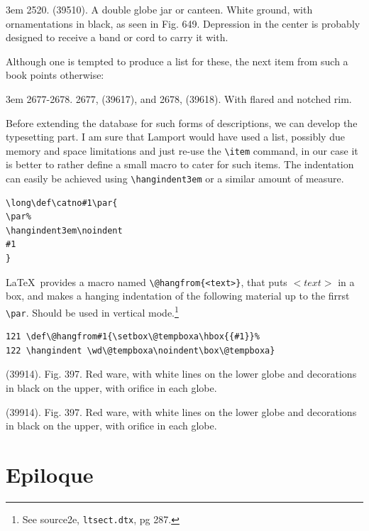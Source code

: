 \documentclass[imperial, justified]{octavo}
\begin{document}
\hangindent3em
2520. (39510). A double globe jar or canteen. White ground, with ornamentations in black, as seen in Fig. 649. Depression in the center is probably designed to receive a band or cord to carry it with.
\smallskip

Although one is tempted to produce a list for these, the next item from such a book points otherwise:
\smallskip

\hangindent3em
2677-2678. 2677, (39617), and 2678, (39618). With flared and notched rim.
\smallskip

Before extending the database for such forms of descriptions, we can develop the typesetting part. I am sure that Lamport would have used a list, possibly due memory and space limitations and just re-use the \verb+\item+ command, in our case it is better to rather define a small macro
to cater for such items. The indentation can easily be achieved using \verb+\hangindent3em+ or a similar amount of measure.

\begin{verbatim}
\long\def\catno#1\par{
\par%
\hangindent3em\noindent
#1
}
\end{verbatim}


\def\catno#1#2{%
    \@hangfrom{#1. }#2
}

\LaTeX\ provides a macro named \verb+\@hangfrom{<text>}+, that puts $<text>$ in a box, and makes a hanging indentation of the following material up to the firrst \verb+\par+. Should be used in vertical mode.\footnote{See source2e, \texttt{ltsect.dtx}, pg 287.}

\begin{verbatim}
121 \def\@hangfrom#1{\setbox\@tempboxa\hbox{{#1}}%
122 \hangindent \wd\@tempboxa\noindent\box\@tempboxa}
\end{verbatim}

\medskip

\catno{289}{(39914). Fig. 397. Red ware, with white lines on the lower globe and decorations in black on the upper, with orifice in each globe.}

\catno{1289}{(39914). Fig. 397. Red ware, with white lines on the lower globe and decorations in black on the upper, with orifice in each globe.}


\makeatother

\section{Epiloque}
\end{document}
